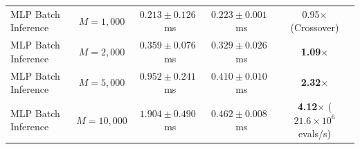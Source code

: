 \begin{table}[t]
{\begin{tabular}{lcccccc}
MLP Batch Inference    & $M=1{,}000$ & $0.213 \pm 0.126$~ms & \multicolumn{2}{c}{$0.223 \pm 0.001$~ms} & \multicolumn{2}{c}{0.95$\times$ (Crossover)} \\
MLP Batch Inference    & $M=2{,}000$ & $0.359 \pm 0.076$~ms & \multicolumn{2}{c}{$0.329 \pm 0.026$~ms} & \multicolumn{2}{c}{\textbf{1.09$\times$}} \\
MLP Batch Inference    & $M=5{,}000$ & $0.952 \pm 0.241$~ms & \multicolumn{2}{c}{$0.410 \pm 0.010$~ms} & \multicolumn{2}{c}{\textbf{2.32$\times$}} \\
MLP Batch Inference    & $M=10{,}000$& $1.904 \pm 0.490$~ms & \multicolumn{2}{c}{$0.462 \pm 0.008$~ms} & \multicolumn{2}{c}{\textbf{4.12$\times$} ($21.6\times 10^6$ evals/s)} \\
\hline
\end{tabular}%
}
\end{table}
